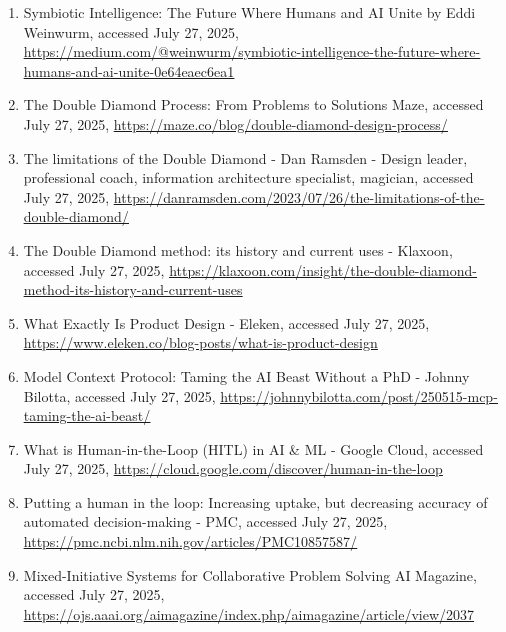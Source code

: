 \documentclass[
  12pt,
  a4paper,
  bibliography=totoc,
  numbers=noenddot
]{scrartcl}
\begin{document}
\begin{enumerate}
\item
  Symbiotic Intelligence: The Future Where Humans and AI Unite
  \textbar{} by Eddi Weinwurm, accessed July 27, 2025,
  \href{https://medium.com/@weinwurm/symbiotic-intelligence-the-future-where-humans-and-ai-unite-0e64eaec6ea1}{\ul{https://medium.com/@weinwurm/symbiotic-intelligence-the-future-where-humans-and-ai-unite-0e64eaec6ea1}}
\item
  The Double Diamond Process: From Problems to Solutions \textbar{}
  Maze, accessed July 27, 2025,
  \href{https://maze.co/blog/double-diamond-design-process/}{\ul{https://maze.co/blog/double-diamond-design-process/}}
\item
  The limitations of the Double Diamond - Dan Ramsden - Design leader,
  professional coach, information architecture specialist, magician,
  accessed July 27, 2025,
  \href{https://danramsden.com/2023/07/26/the-limitations-of-the-double-diamond/}{\ul{https://danramsden.com/2023/07/26/the-limitations-of-the-double-diamond/}}
\item
  The Double Diamond method: its history and current uses - Klaxoon,
  accessed July 27, 2025,
  \href{https://klaxoon.com/insight/the-double-diamond-method-its-history-and-current-uses}{\ul{https://klaxoon.com/insight/the-double-diamond-method-its-history-and-current-uses}}
\item
  What Exactly Is Product Design - Eleken, accessed July 27, 2025,
  \href{https://www.eleken.co/blog-posts/what-is-product-design}{\ul{https://www.eleken.co/blog-posts/what-is-product-design}}
\item
  Model Context Protocol: Taming the AI Beast Without a PhD - Johnny
  Bilotta, accessed July 27, 2025,
  \href{https://johnnybilotta.com/post/250515-mcp-taming-the-ai-beast/}{\ul{https://johnnybilotta.com/post/250515-mcp-taming-the-ai-beast/}}
\item
  What is Human-in-the-Loop (HITL) in AI \& ML - Google Cloud, accessed
  July 27, 2025,
  \href{https://cloud.google.com/discover/human-in-the-loop}{\ul{https://cloud.google.com/discover/human-in-the-loop}}
\item
  Putting a human in the loop: Increasing uptake, but decreasing
  accuracy of automated decision-making - PMC, accessed July 27, 2025,
  \href{https://pmc.ncbi.nlm.nih.gov/articles/PMC10857587/}{\ul{https://pmc.ncbi.nlm.nih.gov/articles/PMC10857587/}}
\item
  Mixed-Initiative Systems for Collaborative Problem Solving \textbar{}
  AI Magazine, accessed July 27, 2025,
  \href{https://ojs.aaai.org/aimagazine/index.php/aimagazine/article/view/2037}{\ul{https://ojs.aaai.org/aimagazine/index.php/aimagazine/article/view/2037}}

\end{enumerate}
\end{document}
